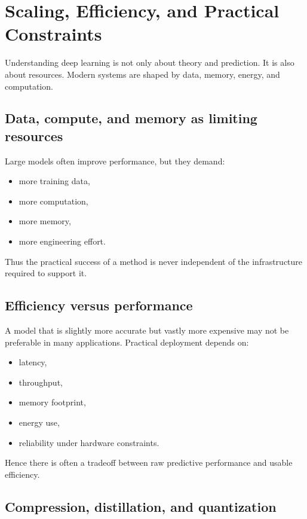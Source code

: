 \section{Scaling, Efficiency, and Practical Constraints}

Understanding deep learning is not only about theory and prediction.
It is also about resources.
Modern systems are shaped by data, memory, energy, and computation.

\subsection*{Data, compute, and memory as limiting resources}

Large models often improve performance, but they demand:
\begin{itemize}
    \item more training data,
    \item more computation,
    \item more memory,
    \item more engineering effort.
\end{itemize}

Thus the practical success of a method is never independent of the infrastructure required to support it.

\subsection*{Efficiency versus performance}

A model that is slightly more accurate but vastly more expensive may not be preferable in many applications.
Practical deployment depends on:
\begin{itemize}
    \item latency,
    \item throughput,
    \item memory footprint,
    \item energy use,
    \item reliability under hardware constraints.
\end{itemize}

Hence there is often a tradeoff between raw predictive performance and usable efficiency.

\subsection*{Compression, distillation, and quantization}


